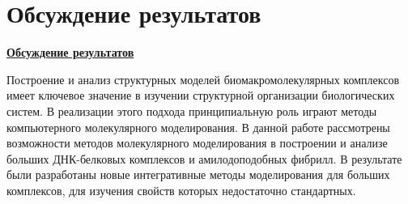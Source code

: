 

\ifdefined\DISSER  
\section*{Обсуждение результатов}
\else 
\underline{\textbf{Обсуждение результатов}}
\fi

Построение и анализ структурных моделей биомакромолекулярных комплексов имеет ключевое значение в изучении структурной организации биологических систем. В реализации этого подхода принципиальную роль играют методы компьютерного молекулярного моделирования. %
 В данной работе рассмотрены возможности методов молекулярного моделирования в построении и анализе больших ДНК-белковых комплексов и амилодоподобных фибрилл. В результате были разработаны новые интегративные методы моделирования для больших комплексов, для изучения свойств которых недостаточно стандартных.


